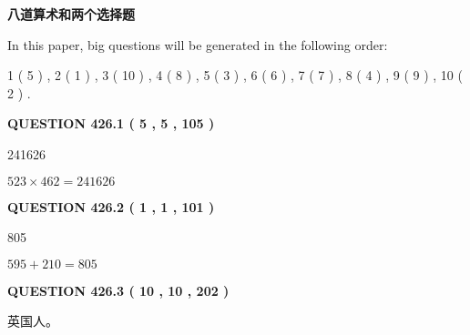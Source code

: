 \documentclass{ctexart}
\begin{document}
   
 \vspace{0.2in}
{\LARGE {\textbf{ 八道算术和两个选择题}}}
   
   
   
\vspace{0.2in}
   
In this paper, big questions will be generated in the following order: 
   
   
   1 ( 5 )
 ,
   2 ( 1 )
 ,
   3 ( 10 )
 ,
   4 ( 8 )
 ,
   5 ( 3 )
 ,
   6 ( 6 )
 ,
   7 ( 7 )
 ,
   8 ( 4 )
 ,
   9 ( 9 )
 ,
   10 ( 2 )
 .
  
\vspace{0.2in}
  
{\textbf{\Large{QUESTION
426.1 
 ( 5 , 5 , 105 )
}}}
  
  
 
 
\noindent{}

241626
 
 
 
 
\noindent{}

$ %
523 \times  %
462=   %
241626$
 
 
  
\vspace{0.2in}
  
{\textbf{\Large{QUESTION
426.2 
 ( 1 , 1 , 101 )
}}}
  
  
 
 
\noindent{}

805
 
 
 
 
\noindent{}

$ %
595 +  %
210=   %
805$
 
 
  
\vspace{0.2in}
  
{\textbf{\Large{QUESTION
426.3 
 ( 10 , 10 , 202 )
}}}
  
  
 
 
\noindent{}
 
 
英国人。
 
 
 
 
  
\vspace{0.2in}
  
\end{document}
